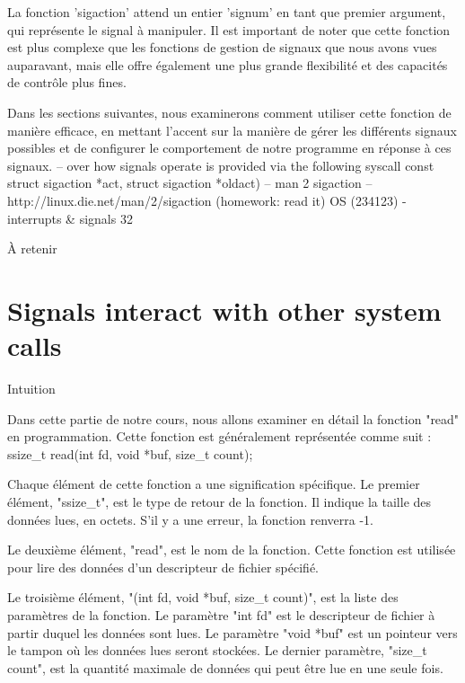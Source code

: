 \documentclass[12pt]{article}
\begin{document}
La fonction 'sigaction' attend un entier 'signum' en tant que premier argument, qui représente le signal à manipuler. Il est important de noter que cette fonction est plus complexe que les fonctions de gestion de signaux que nous avons vues auparavant, mais elle offre également une plus grande flexibilité et des capacités de contrôle plus fines.

Dans les sections suivantes, nous examinerons comment utiliser cette fonction de manière efficace, en mettant l'accent sur la manière de gérer les différents signaux possibles et de configurer le comportement de notre programme en réponse à ces signaux.
– over how signals operate is provided via the following syscall
const struct sigaction *act,
struct sigaction *oldact)
– man 2 sigaction – http://linux.die.net/man/2/sigaction
(homework: read it)
OS (234123) - interrupts \& signals
32
\begin{aretenir}{À retenir}
\end{aretenir}

\section{Signals interact with other system calls}
\begin{myvulga}{Intuition}
\end{myvulga}
Dans cette partie de notre cours, nous allons examiner en détail la fonction "read" en programmation. Cette fonction est généralement représentée comme suit : ssize_t read(int fd, void *buf, size_t count); 

Chaque élément de cette fonction a une signification spécifique. Le premier élément, "ssize_t", est le type de retour de la fonction. Il indique la taille des données lues, en octets. S'il y a une erreur, la fonction renverra -1. 

Le deuxième élément, "read", est le nom de la fonction. Cette fonction est utilisée pour lire des données d'un descripteur de fichier spécifié. 

Le troisième élément, "(int fd, void *buf, size_t count)", est la liste des paramètres de la fonction. Le paramètre "int fd" est le descripteur de fichier à partir duquel les données sont lues. Le paramètre "void *buf" est un pointeur vers le tampon où les données lues seront stockées. Le dernier paramètre, "size_t count", est la quantité maximale de données qui peut être lue en une seule fois. 
\end{document}
